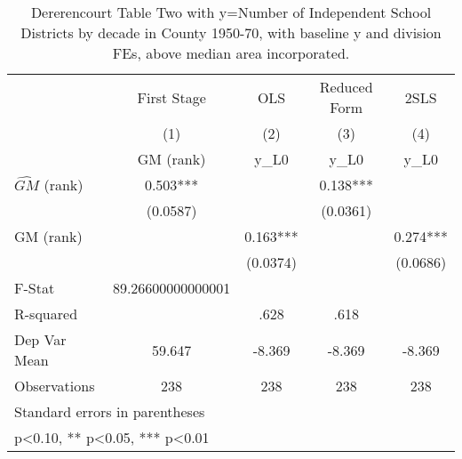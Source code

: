 \begin{table}[htbp]\centering
\def\sym#1{\ifmmode^{#1}\else\(^{#1}\)\fi}
\caption{Dererencourt Table Two with y=Number of Independent School Districts by decade in County 1950-70, with baseline y and division FEs, above median area incorporated.}
\begin{tabular}{l*{4}{c}}
\toprule
                    & First Stage   &         OLS   &Reduced Form   &        2SLS   \\
                    &\multicolumn{1}{c}{(1)}&\multicolumn{1}{c}{(2)}&\multicolumn{1}{c}{(3)}&\multicolumn{1}{c}{(4)}\\
                    &\multicolumn{1}{c}{GM  (rank)}&\multicolumn{1}{c}{y\_L0}&\multicolumn{1}{c}{y\_L0}&\multicolumn{1}{c}{y\_L0}\\
\midrule
$\hat{GM}$ (rank)   &       0.503***&               &       0.138***&               \\
                    &    (0.0587)   &               &    (0.0361)   &               \\
\addlinespace
GM  (rank)          &               &       0.163***&               &       0.274***\\
                    &               &    (0.0374)   &               &    (0.0686)   \\
\midrule
F-Stat              &89.26600000000001   &               &               &               \\
R-squared           &               &        .628   &        .618   &               \\
Dep Var Mean        &      59.647   &      -8.369   &      -8.369   &      -8.369   \\
Observations        &         238   &         238   &         238   &         238   \\
\bottomrule
\multicolumn{5}{l}{\footnotesize Standard errors in parentheses}\\
\multicolumn{5}{l}{\footnotesize * p<0.10, ** p<0.05, *** p<0.01}\\
\end{tabular}
\end{table}
